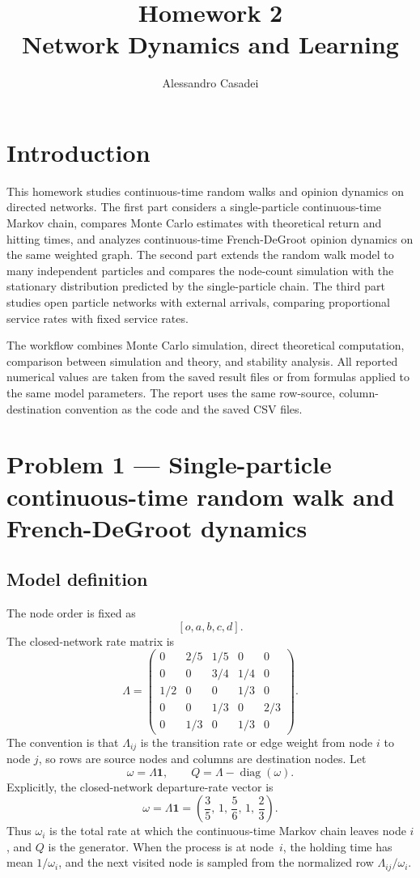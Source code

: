 \documentclass[11pt]{article}
\title{Homework 2\\Network Dynamics and Learning}
\author{Alessandro Casadei}
\date{}
\begin{document}
\maketitle

\section{Introduction}

This homework studies continuous-time random walks and opinion dynamics on
directed networks. The first part considers a single-particle
continuous-time Markov chain, compares Monte Carlo estimates with theoretical
return and hitting times, and analyzes continuous-time French-DeGroot opinion
dynamics on the same weighted graph. The second part extends the random walk
model to many independent particles and compares the node-count simulation
with the stationary distribution predicted by the single-particle chain. The
third part studies open particle networks with external arrivals, comparing
proportional service rates with fixed service rates.

The workflow combines Monte Carlo simulation, direct theoretical computation,
comparison between simulation and theory, and stability analysis. All reported
numerical values are taken from the saved result files or from formulas
applied to the same model parameters. The report uses the same row-source,
column-destination convention as the code and the saved CSV files.

\section{Problem 1 --- Single-particle continuous-time random walk and French-DeGroot dynamics}

\subsection*{Model definition}

The node order is fixed as
\[
    [o,a,b,c,d].
\]
The closed-network rate matrix is
\[
\Lambda =
\begin{pmatrix}
0 & 2/5 & 1/5 & 0 & 0\\
0 & 0 & 3/4 & 1/4 & 0\\
1/2 & 0 & 0 & 1/3 & 0\\
0 & 0 & 1/3 & 0 & 2/3\\
0 & 1/3 & 0 & 1/3 & 0
\end{pmatrix}.
\]
The convention is that $\Lambda_{ij}$ is the transition rate or edge weight from
node $i$ to node $j$, so rows are source nodes and columns are destination
nodes. Let
\[
    \omega = \Lambda \mathbf{1}, \qquad
    Q = \Lambda - \operatorname{diag}(\omega).
\]
Explicitly, the closed-network departure-rate vector is
\[
\omega=\Lambda\mathbf{1}
=
\left(\frac{3}{5},\,1,\,\frac{5}{6},\,1,\,\frac{2}{3}\right).
\]
Thus $\omega_i$ is the total rate at which the continuous-time Markov chain
leaves node $i$, and $Q$ is the generator. When the process is at node~$i$,
the holding time has mean $1/\omega_i$, and the next visited node is sampled
from the normalized row $\Lambda_{ij}/\omega_i$.
\end{document}
